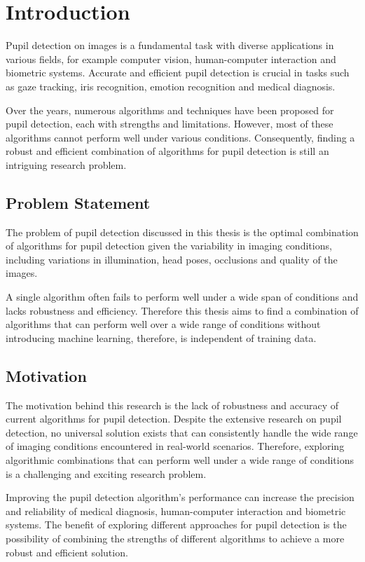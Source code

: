 \newcommand{\package}{\emph}

\chapter{Introduction}
\label{chap:introduction}
Pupil detection on images is a fundamental task with diverse applications in various fields, for example computer vision, human-computer interaction and biometric systems. Accurate and efficient pupil detection is crucial in tasks such as gaze tracking, iris recognition, emotion recognition and medical diagnosis.

Over the years, numerous algorithms and techniques have been proposed for pupil detection, each with strengths and limitations. However, most of these algorithms cannot perform well under various conditions. Consequently, finding a robust and efficient combination of algorithms for pupil detection is still an intriguing research problem. 
\section{Problem Statement}
\label{sec:problem_statement}
The problem of pupil detection discussed in this thesis is the optimal combination of algorithms for pupil detection given the variability in imaging conditions, including variations in illumination, head poses, occlusions and quality of the images.

A single algorithm often fails to perform well under a wide span of conditions and lacks robustness and efficiency. Therefore this thesis aims to find a combination of algorithms that can perform well over a wide range of conditions without introducing machine learning, therefore, is independent of training data. 
\section{Motivation}
\label{sec:motivation}
The motivation behind this research is the lack of robustness and accuracy of current algorithms for pupil detection. Despite the extensive research on pupil detection, no universal solution exists that can consistently handle the wide range of imaging conditions encountered in real-world scenarios. Therefore, exploring algorithmic combinations that can perform well under a wide range of conditions is a challenging and exciting research problem. 

Improving the pupil detection algorithm's performance can increase the precision and reliability of medical diagnosis, human-computer interaction and biometric systems. The benefit of exploring different approaches for pupil detection is the possibility of combining the strengths of different algorithms to achieve a more robust and efficient solution.

